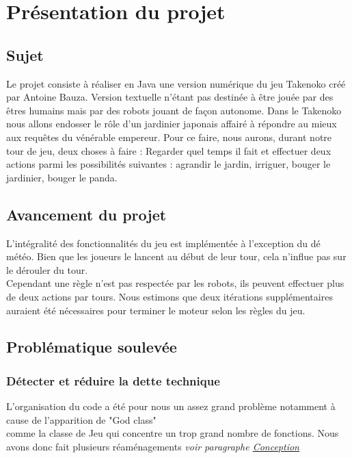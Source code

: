 

\chapter{Présentation du projet}


\section{Sujet}
Le projet consiste à réaliser en Java une version numérique du jeu Takenoko créé par Antoine Bauza. Version textuelle n'étant pas destinée à être jouée par des êtres humains mais par des robots jouant de façon autonome. Dans le Takenoko nous allons endosser le rôle d'un jardinier japonais affairé à répondre au mieux aux requêtes du vénérable empereur. Pour ce faire, nous aurons, durant notre tour de jeu, deux choses à faire : Regarder quel temps il fait et effectuer deux actions parmi les possibilités suivantes : agrandir le jardin, irriguer, bouger le jardinier, bouger le panda. 

\section{Avancement du projet}
L'intégralité des fonctionnalités du jeu est implémentée à l'exception du dé météo. Bien que les joueurs le lancent au début de leur tour, cela n'influe pas sur le dérouler du tour.\\
Cependant une règle n'est pas respectée par les robots, ils peuvent effectuer plus de deux actions par tours.
Nous estimons que deux itérations supplémentaires auraient été nécessaires pour terminer le moteur selon les règles du jeu.
\section{Problématique soulevée}

\subsection{Détecter et réduire la dette technique}
L'organisation du code a été pour nous un assez grand problème notamment à cause de l'apparition de "God class"\footnotemark\\ comme la classe de Jeu qui concentre un trop grand nombre de fonctions. Nous avons donc fait plusieurs réaménagements \textit{voir paragraphe \hyperref[conception]{Conception}} \\ 

